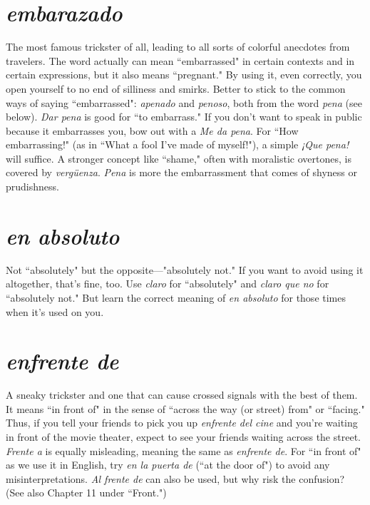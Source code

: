 \section{\emph{embarazado}}

The most famous trickster of all, leading to
all sorts of colorful anecdotes from travelers. The word actually can
mean ``embarrassed" in certain contexts and in certain expressions,
but it also means ``pregnant." By using it, even correctly, you open
yourself to no end of silliness and smirks. Better to stick to the common ways of saying ``embarrassed": \emph{apenado} and \emph{penoso}, both from
the word \emph{pena} (see below). \emph{Dar pena} is good for ``to embarrass." If you
don't want to speak in public because it embarrasses you, bow out with
a \emph{Me da pena}. For ``How embarrassing!" (as in ``What a fool I've made
of myself!"), a simple \emph{¡Que pena!} will suffice. A stronger concept like
``shame," often with moralistic overtones, is covered by \emph{vergüenza}.
\emph{Pena} is more the embarrassment that comes of shyness or prudishness.

\section{\emph{en absoluto}}

Not ``absolutely" but the opposite---"absolutely not." If you want to avoid using it altogether, that's fine, too.
Use \emph{claro} for ``absolutely" and \emph{claro que no} for ``absolutely not." But
learn the correct meaning of \emph{en absoluto} for those times when it's
used on you.

\section{\emph{enfrente de}}

A sneaky trickster and one that can cause
crossed signals with the best of them. It means ``in front of" in the
sense of ``across the way (or street) from" or ``facing." Thus, if you tell
your friends to pick you up \emph{enfrente del cine} and you're waiting in
front of the movie theater, expect to see your friends waiting across
the street. \emph{Frente a} is equally misleading, meaning the same as \emph{enfrente de}. For ``in front of" as we use it in English, try \emph{en la puerta de}
(``at the door of") to avoid any misinterpretations. \emph{Al frente de} can also
be used, but why risk the confusion? (See also Chapter 11 under
``Front.")

